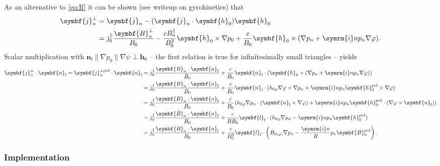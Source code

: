 \documentclass[a4paper, 10pt, english]{article}
\let\temp\varrho
\let\varrho\rho
\let\rho\temp
\let\temp\vartheta
\let\vartheta\theta
\let\theta\temp
\let\temp\varphi
\let\varphi\phi
\let\phi\temp
\let\vec\symbf
\newcommand*\im{\ensuremath{\symrm{i}}}  %
\newcommand*\pol{\ensuremath{\textrm{pol}}}  %
\newcommand*\fs{\ensuremath{\textrm{f}}}  %
\begin{document}
As an alternative to \cref{eq:If} it can be shown (see writeup on gyrokinetics) that
\begin{align}
  \vec{j}_{n}^{\perp} &= \vec{j}_{n} - (\vec{j}_{n} \cdot \vec{h}_{0}) \vec{h}_{0} \nonumber \\
  &= j_{0}^{\parallel} \frac{\vec{B}_{n}^{\perp}}{B_{0}} - \frac{c B_{n}^{\parallel}}{B_{0}^{2}} \vec{h}_{0} \times \nabla p_{0} + \frac{c}{B_{0}} \vec{h}_{0} \times (\nabla p_{n} + \im n p_{n} \nabla \phi).
\end{align}
Scalar multiplication with $\vec{n}_{\fs} \parallel \nabla p_{0} \parallel \nabla \psi \perp \vec{h}_{0}$ -- the first relation is true for infinitesimally small triangles -- yields
\begin{align}
  \vec{j}_{n}^{\perp} \cdot \vec{n}_{\fs} = \vec{j}_{n}^{\perp \pol} \cdot \vec{n}_{\fs} &= j_{0}^{\parallel} \frac{\vec{B}_{n} \cdot \vec{n}_{\fs}}{B_{0}} + \frac{c}{B_{0}} \vec{n}_{\fs} \cdot (\vec{h}_{0} \times (\nabla p_{n} + \im n p_{n} \nabla \phi)) \nonumber \\
  &= j_{0}^{\parallel} \frac{\vec{B}_{n} \cdot \vec{n}_{\fs}}{B_{0}} + \frac{c}{B_{0}} \vec{n}_{\fs} \cdot (h_{0 \phi} \nabla \phi \times \nabla p_{n} + \im n p_{n} \vec{h}_{0}^{\pol} \times \nabla \phi) \nonumber \\
  &= j_{0}^{\parallel} \frac{\vec{B}_{n} \cdot \vec{n}_{\fs}}{B_{0}} + \frac{c}{B_{0}} (h_{0 \phi} \nabla p_{n} \cdot (\vec{n}_{\fs} \times \nabla \phi) + \im n p_{n} \vec{h}_{0}^{\pol} \cdot (\nabla \phi \times \vec{n}_{\fs})) \nonumber \\
  &= j_{0}^{\parallel} \frac{\vec{B}_{n} \cdot \vec{n}_{\fs}}{B_{0}} + \frac{c}{R B_{0}} \vec{l}_{\fs} \cdot (h_{0 \phi} \nabla p_{n} - \im n p_{n} \vec{h}_{0}^{\pol}) \nonumber \\
  &= j_{0}^{\parallel} \frac{\vec{B}_{n} \cdot \vec{n}_{\fs}}{B_{0}} + \frac{c}{B_{0}^{2}} \vec{l}_{\fs} \cdot \left( B_{0 (\phi)} \nabla p_{n} - \frac{\im n}{R} p_{n} \vec{B}_{0}^{\pol} \right). \label{eq:I3_alt}
\end{align}

\subsubsection{Implementation}
\label{sec:compute_currn}
\end{document}
